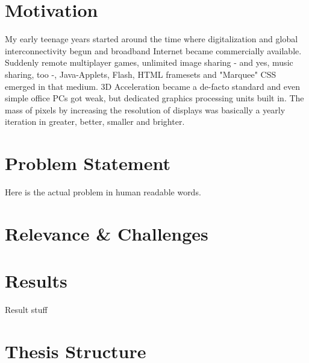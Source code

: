 \section{Motivation}
\label{sec:intro:motivation}

My early teenage years started around the time where digitalization and global
interconnectivity begun and broadband Internet became commercially available.
Suddenly remote multiplayer games, unlimited image sharing - and yes, music
sharing, too -, Java-Applets, Flash, HTML framesets and "Marquee" CSS emerged in
that medium. 3D Acceleration became a de-facto standard and even simple office
PCs got weak, but dedicated graphics processing units built in. The mass of
pixels by increasing the resolution of displays was basically a yearly
iteration in greater, better, smaller and brighter.


\section{Problem Statement}

Here is the actual problem in human readable words.

\section{Relevance \& Challenges}
\label{sec:intro:relevance}


\section{Results}
\label{sec:intro:results}

Result stuff

\section{Thesis Structure}
\label{sec:intro:structure}

